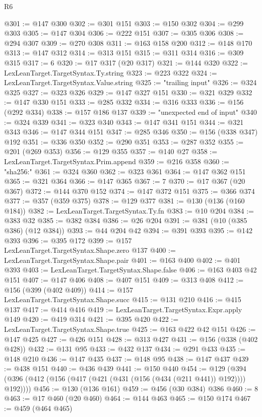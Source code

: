 \begin{lexlean}{R6}
\begin{coremodule}
@301 := @147 @300
@302 := @301 @151
@303 := @150 @302
@304 := @299 @303
@305 := @147 @304
@306 := @222 @151
@307 := @305 @306
@308 := @294 @307
@309 := @270 @308
@311 := @163 @158 @200
@312 := @148 @170
@313 := @147 @312
@314 := @313 @151
@315 := @311 @314
@316 := @309 @315
@317 := 6
@320 := @17 @317 (@20 @317)
@321 := @144 @320
@322 := LexLeanTarget.TargetSyntax.Ty.string
@323 := @223 @322
@324 := LexLeanTarget.TargetSyntax.Value.string
@325 := "trailing input"
@326 := @324 @325
@327 := @323 @326
@329 := @147 @327 @151
@330 := @321 @329
@332 := @147 @330 @151
@333 := @285 @332
@334 := @316 @333
@336 := @156 (@292 @334)
@338 := @157 @186 @137
@339 := "unexpected end of input"
@340 := @324 @339
@341 := @323 @340
@343 := @147 @341 @151
@344 := @321 @343
@346 := @147 @344 @151
@347 := @285 @346
@350 := @156 (@338 @347) @192
@351 := @336 @350
@352 := @290 @351
@353 := @287 @352
@355 := @201 (@269 @353)
@356 := @129 @355
@357 := @140 @27
@358 := LexLeanTarget.TargetSyntax.Prim.append
@359 := @216 @358
@360 := "sha256:"
@361 := @324 @360
@362 := @323 @361
@364 := @147 @362 @151
@365 := @321 @364
@366 := @147 @365
@367 := 7
@370 := @17 @367 (@20 @367)
@372 := @144 @370 @152
@374 := @147 @372 @151
@375 := @366 @374
@377 := @357 (@359 @375)
@378 := @129 @377
@381 := @130 (@136 (@160 @184))
@382 := LexLeanTarget.TargetSyntax.Ty.fn
@383 := @10 @204
@384 := @383 @32
@385 := @382 @384
@386 := @26 @204
@391 := @381 (@10 (@385 @386) (@12 @384))
@393 := @44 @204 @42
@394 := @391 @393
@395 := @142 @393
@396 := @395 @172
@399 := @157 LexLeanTarget.TargetSyntax.Shape.zero @137
@400 := LexLeanTarget.TargetSyntax.Shape.pair
@401 := @163 @400
@402 := @401 @393
@403 := LexLeanTarget.TargetSyntax.Shape.false
@406 := @163 @403 @42 @151
@407 := @147 @406
@408 := @407 @151
@409 := @313 @408
@412 := @156 (@399 (@402 @409))
@414 := @157 LexLeanTarget.TargetSyntax.Shape.succ
@415 := @131 @210
@416 := @415 @137
@417 := @414 @416
@419 := LexLeanTarget.TargetSyntax.Expr.apply @149
@420 := @419 @314
@421 := @395 @420
@422 := LexLeanTarget.TargetSyntax.Shape.true
@425 := @163 @422 @42 @151
@426 := @147 @425
@427 := @426 @151
@428 := @313 @427
@431 := @156 (@338 (@402 @428))
@432 := @131 @95
@433 := @432 @137
@434 := @291 @433
@435 := @148 @210
@436 := @147 @435
@437 := @148 @95
@438 := @147 @437
@439 := @438 @151
@440 := @436 @439
@441 := @150 @440
@454 := @129 (@394 (@396 (@412 (@156 (@417 (@421 (@431 (@156 (@434 (@211 @441)) @192)))) @192))))
@456 := @130 (@136 @161)
@459 := @456 (@30 @384) @386
@460 := 8
@463 := @17 @460 (@20 @460)
@464 := @144 @463
@465 := @150 @174
@467 := @459 (@464 @465)

\end{coremodule}
\end{lexlean}
